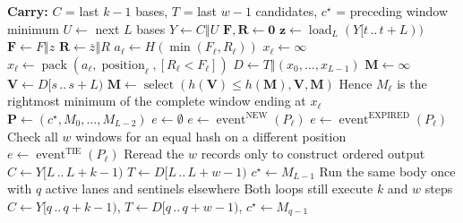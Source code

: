   \begin{algorithm}[H]
  \caption{One iteration: build $L$ $k$-mers and rescan $L$ adjacent windows}
  \label{alg:rewrite-generic-chronological}
  \footnotesize
  \begin{algorithmic}[1]
  \State \textbf{Carry:} $C$ = last $k-1$ bases,
         $T$ = last $w-1$ candidates,
         $c^\star$ = preceding window minimum
    \State $U\gets$ next $L$ bases
    \State $Y\gets C\mathbin\Vert U$
    \State $\mathbf F,\mathbf R\gets\mathbf0$
      \State $\mathbf z\gets\operatorname{load}_L(Y[t\,..\,t+L))$
      \State $\mathbf F\gets F\mathbin\Vert z$
      \State $\mathbf R\gets\overline{z}\mathbin\Vert R$
    \EndFor
      \State $a_\ell\gets H(\min(F_\ell,R_\ell))$
        \State $x_\ell\gets\infty$
      \Else
        \State $x_\ell\gets\operatorname{pack}
          (a_\ell,\operatorname{position}_\ell,[R_\ell<F_\ell])$
      \EndIf
    \EndFor
    \State $D\gets T\mathbin\Vert(x_0,\ldots,x_{L-1})$
    \State $\mathbf M\gets\infty$
      \State $\mathbf V\gets D[s\,..\,s+L)$
      \State $\mathbf M\gets
        \operatorname{select}(h(\mathbf V)\leq h(\mathbf M),
                              \mathbf V,\mathbf M)$
    \EndFor
    \State Hence $M_\ell$ is the rightmost minimum of the complete window
           ending at $x_\ell$
    \State $\mathbf P\gets(c^\star,M_0,\ldots,M_{L-2})$
      \State $e\gets\emptyset$
        \State $e\gets\operatorname{event}^{\mathrm{NEW}}(P_\ell)$
      \EndIf
        \State $e\gets\operatorname{event}^{\mathrm{EXPIRED}}(P_\ell)$
      \EndIf
        \State Check all $w$ windows for an equal hash on a different position
        \State $e\gets\operatorname{event}^{\mathrm{TIE}}(P_\ell)$
      \EndIf
        \State Reread the $w$ records only to construct ordered output
      \EndIf
    \EndFor
    \State $C\gets Y[L\,..\,L+k-1)$
    \State $T\gets D[L\,..\,L+w-1)$
    \State $c^\star\gets M_{L-1}$
  \EndWhile
    \State Run the same body once with $q$ active lanes and sentinels elsewhere
    \State Both loops still execute $k$ and $w$ steps
    \State $C\gets Y[q\,..\,q+k-1)$,
           $T\gets D[q\,..\,q+w-1)$,
           $c^\star\gets M_{q-1}$
  \EndIf
  \end{algorithmic}
  \end{algorithm}
  
